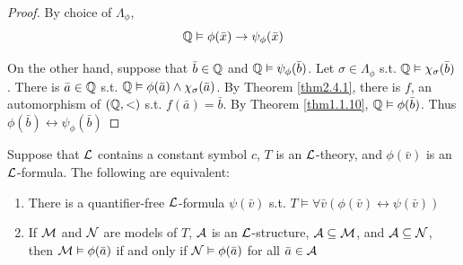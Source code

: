 \documentclass[11pt]{article}
\begin{document}
\begin{proof}
By choice of \(\Lambda_\phi\),
\begin{equation*}
\mathbb{Q}\vDash\phi(\bar{x})\to\psi_\phi(\bar{x})
\end{equation*}

On the other hand, suppose that \(\bar{b}\in\mathbb{Q}\) and
\(\mathbb{Q}\vDash\psi_\phi(\bar{b})\). Let \(\sigma\in\Lambda_\phi\) s.t. \(\mathbb{Q}\vDash\chi_\sigma(\bar{b})\).
There is \(\bar{a}\in\mathbb{Q}\) s.t. \(\mathbb{Q}\vDash\phi(\bar{a})\wedge\chi_\sigma(\bar{a})\). By Theorem
\ref{thm2.4.1}, there is \(f\), an automorphism of \((\mathbb{Q},<)\) s.t.
\(f(\bar{a})=\bar{b}\). By Theorem \ref{thm1.1.10}, \(\mathbb{Q}\vDash\phi(\bar{b})\).
Thus \(\phi(\bar{b})\leftrightarrow\psi_\phi(\bar{b})\)
\end{proof}

\begin{theorem}[]
\label{thm3.1.4}
Suppose that \(\mathcal{L}\) contains a constant symbol \(c\), \(T\) is an
\(\mathcal{L}\)-theory, and \(\phi(\bar{v})\) is an \(\mathcal{L}\)-formula. The following
are equivalent:
\begin{enumerate}
\item There is a quantifier-free \(\mathcal{L}\)-formula \(\psi(\bar{v})\) s.t.
\(T\vDash\forall\bar{v}(\phi(\bar{v})\leftrightarrow\psi(\bar{v}))\)
\item If \(\mathcal{M}\) and \(\mathcal{N}\) are models of \(T\), \(\mathcal{A}\) is an
\(\mathcal{L}\)-structure, \(\mathcal{A}\subseteq\mathcal{M}\), and \(\mathcal{A}\subseteq\mathcal{N}\),
then \(\mathcal{M}\vDash\phi(\bar{a})\) if and only if \(\mathcal{N}\vDash\phi(\bar{a})\)
for all \(\bar{a}\in\mathcal{A}\)
\end{enumerate}
\end{theorem}
\end{document}
